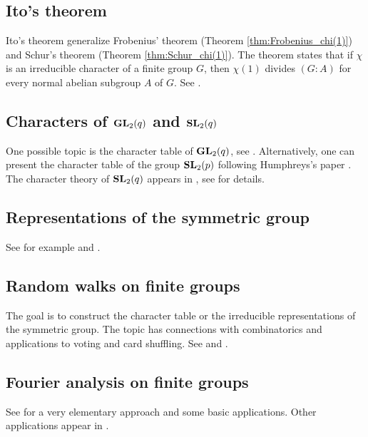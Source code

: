 
\subsection*{Ito's theorem}

Ito's theorem generalize Frobenius' theorem
(Theorem \ref{thm:Frobenius_chi(1)})  
and Schur's theorem (Theorem \ref{thm:Schur_chi(1)}). 
The theorem states that if $\chi$ is an irreducible character
of a finite group $G$, then $\chi(1)$ divides 
$(G:A)$ for every normal abelian subgroup $A$ of $G$. 
See \cite[\S8.1]{MR0450380}. 

\subsection*{Characters of $\mathbf{GL}_2(q)$ and $\mathbf{SL}_2(q)$}

One possible topic is the character table of $\mathbf{GL}_2(q)$, see
\cite[\S5.2]{MR2867444}. Alternatively, one can 
present the character table of the group $\mathbf{SL}_2(p)$  
following Humphreys's paper \cite{MR364478}. 
The character theory of $\mathbf{SL}_2(q)$ appears in 
\cite[\S5.2]{MR2867444}, see 
\cite[Chapter 20]{MR1650707} for details. 

\subsection*{Representations of the symmetric group}

See for example \cite[\S10]{MR2867444} and 
\cite{MR1153249}. 

\subsection*{Random walks on finite groups}

The goal is to construct the character table or 
the irreducible representations of the symmetric group. 
The topic has connections with combinatorics and applications 
to voting and card shuffling. 
See \cite[4]{MR1153249} and \cite[\S11]{MR2867444}.

\subsection*{Fourier analysis on finite groups}

See \cite[\S5]{MR2867444} for a very elementary approach and some
basic applications. Other applications 
appear in \cite{MR1695775}.

